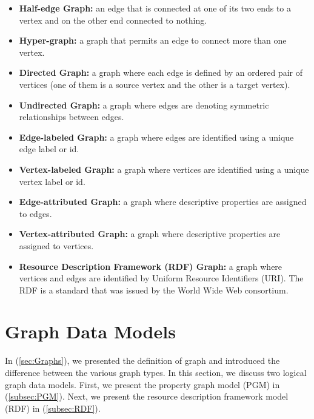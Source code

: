 {\begin{itemize}
\item \textbf{Half-edge Graph:} an edge that is connected at one of its two ends to a vertex and on the other end connected to nothing.

\item \textbf{Hyper-graph:} a graph that permits an edge to connect more than one vertex.

\item \textbf{Directed Graph:} a graph where each edge is defined by an ordered pair of vertices (one of them is a source vertex and the other is a target vertex).

\item \textbf{Undirected Graph:} a graph where edges are denoting symmetric relationships between edges.

\item \textbf{Edge-labeled Graph:} a graph where edges are identified using a unique edge label or id.

\item \textbf{Vertex-labeled Graph:} a graph where vertices are identified using a unique vertex label or id.

\item \textbf{Edge-attributed Graph:} a graph where descriptive properties are assigned to edges.

\item \textbf{Vertex-attributed Graph:} a graph where descriptive properties are assigned to vertices.

\item \textbf{Resource Description Framework (RDF) Graph:} a graph where vertices and edges are identified by Uniform Resource Identifiers (URI). The RDF is a standard that was issued by the World Wide Web consortium.

\end{itemize}


\section{Graph Data Models}
\label{sec:GraphModels}

In (\ref{sec:Graphs}), we presented the definition of graph and introduced the difference between the various graph types. In this section, we discuss two logical graph data models. First, we present the property graph model (PGM) in (\ref{subsec:PGM}). Next, we present the resource description framework model (RDF) in (\ref{subsec:RDF}).


}
